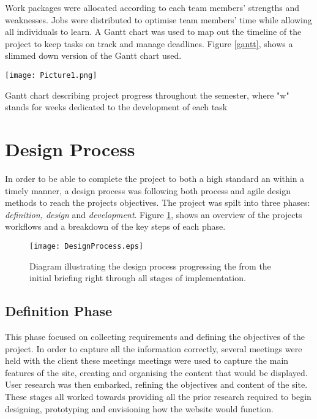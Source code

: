 \documentclass[fontsize=11pt]{extarticle}
\numberwithin{figure}{section} %
\begin{document}
Work packages were allocated according to each team members' strengths
and weaknesses. Jobs were distributed to optimise team members' time
while allowing all individuals to learn. A Gantt chart was used to map
out the timeline of the project to keep tasks on track and manage
deadlines. Figure \ref{gantt}, shows a slimmed down version of the Gantt
chart used.

\begin{landscape}
\begin{table}[H]
      \centering
      \texttt{[image: Picture1.png]}
      \caption{Gantt chart describing project progress throughout the semester, where "w" stands for weeks dedicated to the development of each task}
\label{gantt}
 \end{table}
 \end{landscape}

\newpage

\hypertarget{design-process}{%
\section{Design Process}\label{design-process}}

In order to be able to complete the project to both a high standard an
within a timely manner, a design process was following both process and
agile design methods to reach the projects objectives. The project was
spilt into three phases: \emph{definition, design} and
\emph{development}. Figure \ref{designprocess}, shows an overview of the
projects workflows and a breakdown of the key steps of each phase.

\begin{figure}[H]
\centering
\texttt{[image: DesignProcess.eps]}
\caption{Diagram illustrating the design process progressing the from the initial briefing right through all stages of implementation.}
\label{designprocess}
\end{figure}

\hypertarget{definition-phase}{%
\subsection{Definition Phase}\label{definition-phase}}

This phase focused on collecting requirements and defining the
objectives of the project. In order to capture all the information
correctly, several meetings were held with the client these meetings
meetings were used to capture the main features of the site, creating
and organising the content that would be displayed. User research was
then embarked, refining the objectives and content of the site. These
stages all worked towards providing all the prior research required to
begin designing, prototyping and envisioning how the website would
function.
\end{document}
